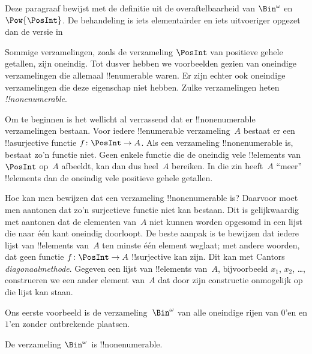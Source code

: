 \documentclass[../../../include/open-logic-section]{subfiles}
\begin{document}


\begin{editorial}
  Deze paragraaf bewijst met de definitie uit  de
  overaftelbaarheid van $\Bin^\omega$ en $\Pow{\PosInt}$. De behandeling
  is iets elementairder en iets uitvoeriger opgezet dan de versie in
\end{editorial}

Sommige verzamelingen, zoals de verzameling $\PosInt$ van positieve
gehele getallen, zijn oneindig. Tot dusver hebben we voorbeelden gezien
van oneindige verzamelingen die allemaal !!{enumerable} waren. Er zijn
echter ook oneindige verzamelingen die deze eigenschap niet hebben. Zulke
verzamelingen heten \emph{!!{nonenumerable}}.

Om te beginnen is het wellicht al verrassend dat er
!!{nonenumerable} verzamelingen bestaan. Voor iedere !!{enumerable}
verzameling~$A$ bestaat er een !!a{surjective} functie $f \colon \PosInt
\to A$. Als een verzameling !!{nonenumerable} is, bestaat zo'n functie
niet. Geen enkele functie die de oneindig vele !!{element}s van~$\PosInt$
op~$A$ afbeeldt, kan dan dus heel~$A$ bereiken. In die zin heeft~$A$
``meer'' !!{element}s dan de oneindig vele positieve gehele getallen.

Hoe kan men bewijzen dat een verzameling !!{nonenumerable} is? Daarvoor
moet men aantonen dat zo'n surjectieve functie niet kan bestaan. Dit is
gelijkwaardig met aantonen dat de elementen van~$A$ niet kunnen worden
opgesomd in een lijst die naar één kant oneindig doorloopt. De beste
aanpak is te bewijzen dat iedere lijst van !!{element}s van~$A$ ten
minste één element weglaat; met andere woorden, dat geen functie
$f\colon \PosInt \to A$ !!{surjective} kan zijn. Dit kan met Cantors
\emph{diagonaalmethode}. Gegeven een lijst van !!{element}s van~$A$,
bijvoorbeeld $x_1$, $x_2$, \dots, construeren we een ander element
van~$A$ dat door zijn constructie onmogelijk op die lijst kan staan.

Ons eerste voorbeeld is de verzameling~$\Bin^\omega$ van alle oneindige
rijen van $0$'en en $1$'en zonder ontbrekende plaatsen.

\begin{thm}
De verzameling $\Bin^\omega$~is !!{nonenumerable}.
\end{thm}
\end{document}

